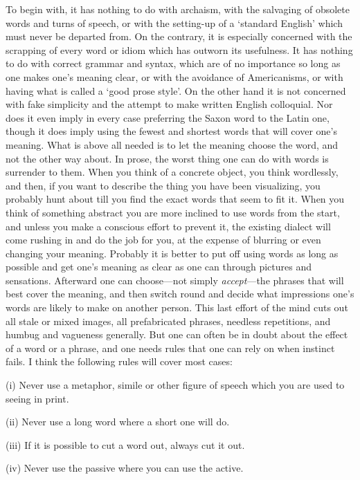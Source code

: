 To begin with, it has nothing to do with archaism, with the salvaging
of obsolete words and turns of speech, or with the setting-up of a
`standard English' which must never be departed from. On the contrary,
it is especially concerned with the scrapping of every word or idiom
which has outworn its usefulness. It has nothing to do with correct
grammar and syntax, which are of no importance so long as one makes
one's meaning clear, or with the avoidance of Americanisms, or with
having what is called a  `good prose style'. On the other
hand it is not concerned with fake simplicity and the attempt to make
written English colloquial. Nor does it even imply in every case
preferring the Saxon word to the Latin one, though it does imply using
the fewest and shortest words that will cover one's meaning. What is
above all needed is to let the meaning choose the word, and not the
other way about. In prose, the worst thing one can do with words is
surrender to them. When you think of a concrete object, you think
wordlessly, and then, if you want to describe the thing you have been
visualizing, you probably hunt about till you find the exact words
that seem to fit it. When you think of something abstract you are more
inclined to use words from the start, and unless you make a conscious
effort to prevent it, the existing dialect will come rushing in and do
the job for you, at the expense of blurring or even changing your
meaning. Probably it is better to put off using words as long as
possible and get one's meaning as clear as one can through pictures
and sensations. Afterward one can choose---not simply
\textit{accept}---the phrases that will best cover the meaning, and
then switch round and decide what impressions one's words are likely
to make on another person. This last effort of the mind cuts out all
stale or mixed images, all prefabricated phrases, needless
repetitions, and humbug and vagueness generally. But one can often be
in doubt about the effect of a word or a phrase, and one needs rules
that one can rely on when instinct fails. I think the following rules
will cover most cases:

(i) Never use a metaphor, simile or other figure of speech which you
are used to seeing in print.

(ii) Never use a long word where a short one will do.

(iii) If it is possible to cut a word out, always cut it out.

(iv) Never use the passive where you can use the active.

